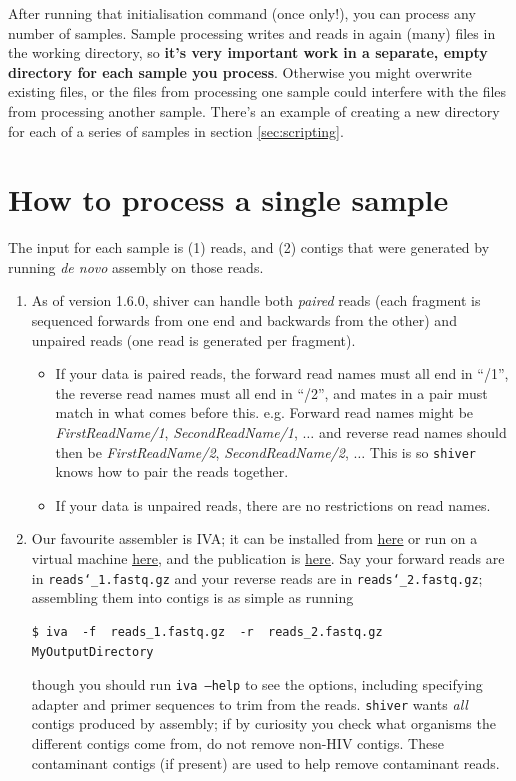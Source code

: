 \documentclass{article}
\newcommand{\shiv}{\c{shiver}\xspace}
\let\c\texttt
\newcommand{\www}{\color{blue} \underline}
\begin{document}
After running that initialisation command (once only!), you can process any number of samples.
Sample processing writes and reads in again (many) files in the working directory, so {\bf it's very important work in a separate, empty directory for each sample you process}.
Otherwise you might overwrite existing files, or the files from processing one sample could interfere with the files from processing another sample.
There's an example of creating a new directory for each of a series of samples in section \ref{sec:scripting}.

\section{How to process a single sample} \label{sec:SingleSample}

The input for each sample is (1) reads, and (2) contigs that were generated by running {\it de novo} assembly on those reads.
\begin{enumerate}
\item As of version 1.6.0, shiver can handle both {\it paired} reads (each fragment is sequenced forwards from one end and backwards from the other) and unpaired reads (one read is generated per fragment).
\begin{itemize}
\item If your data is paired reads, the forward read names must all end in ``/1'', the reverse read names must all end in ``/2'', and mates in a pair must match in what comes before this.
e.g. Forward read names might be {\it FirstReadName/1}, {\it SecondReadName/1}, $\ldots$ and reverse read names should then be {\it FirstReadName/2}, {\it SecondReadName/2}, $\ldots$ This is so \shiv knows how to pair the reads together.
\item If your data is unpaired reads, there are no restrictions on read names.
\end{itemize}
\item Our favourite assembler is IVA; it can be installed from \href{http://sanger-pathogens.github.io/iva/}{\www{here}} or run on a virtual machine \href{http://sanger-pathogens.github.io/pathogens-vm/}{\www{here}}, and the publication is \href{http://bioinformatics.oxfordjournals.org/content/early/2015/02/27/bioinformatics.btv120.abstract}{\www{here}}.
Say your forward reads are in \c{reads\char`_1.fastq.gz} and your reverse reads are in \c{reads\char`_2.fastq.gz}; assembling them into contigs is as simple as running
\begin{Verbatim}[samepage=true]
$ iva  -f  reads_1.fastq.gz  -r  reads_2.fastq.gz  MyOutputDirectory
\end{Verbatim}
though you should run \c{iva --help} to see the options, including specifying adapter and primer sequences to trim from the reads.
\shiv wants {\it all} contigs produced by assembly; if by curiosity you check what organisms the different contigs come from, do not remove non-HIV contigs.
These contaminant contigs (if present) are used to help remove contaminant reads.
\end{enumerate}
\end{document}

